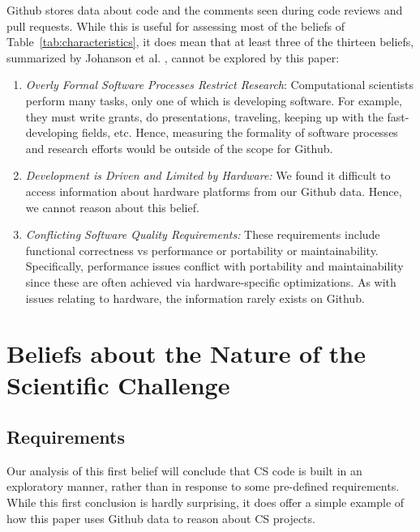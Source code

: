 \documentclass[sigconf,review,anonymous]{acmart}
\newcommand{\be}{\begin{enumerate}}
\newcommand{\ee}{\end{enumerate}}
\begin{document}
Github stores data about code and the comments seen during code reviews and pull requests. While this is useful for assessing most of the beliefs of Table~\ref{tab:characteristics}, it does mean that at least three of the thirteen beliefs, summarized by Johanson et al. \cite{johan18_secs}, cannot be explored by this paper:

\be
\item {\em Overly Formal Software Processes Restrict Research}: Computational scientists perform many tasks,
only one of which is developing software. For example,
they must write grants, do presentations, traveling, keeping up with the fast-developing fields, etc. Hence, measuring the formality of software processes and research efforts would be outside of the scope for Github.
\item {\em Development is Driven and Limited by Hardware:}
We found it difficult to access information about hardware platforms from our Github data. Hence, we cannot reason about this belief.
\item {\em Conflicting Software Quality Requirements:} These requirements include functional correctness vs
performance or portability or maintainability. Specifically, performance issues conflict with portability and maintainability since these are often achieved via hardware-specific optimizations. As with issues
relating to hardware,
the information rarely exists on Github. 
\ee

\section{Beliefs about the Nature of the Scientific Challenge}


\subsection{Requirements}


Our analysis of this first belief will conclude that
CS code is built in an exploratory manner,
rather than in response to some pre-defined
requirements. While this first conclusion is hardly
surprising, it does offer a simple example
of how this paper uses Github
data to reason about CS projects.
\end{document}
